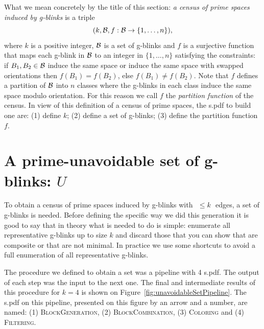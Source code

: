 \newpage

What we mean concretely by the title of this section:
{\it a census of prime spaces induced by
g-blinks} is a triple \vspace{-0.3cm}$$(k,{\cal B},f:{\cal B}
\rightarrow \{1, \ldots, n\}),\vspace{-0.3cm}$$ where $k$ is a
positive integer, ${\cal B}$ is a \kpu set of g-blinks and $f$ is a
surjective function that maps each g-blink in ${\cal B}$ to an integer
in $\{1, \ldots, n\}$ satisfying the constraints: if $B_1,B_2 \in
{\cal B}$ induce the same space or induce the same space with
swapped orientations then $f(B_1) = f(B_2)$, else
$f(B_1) \neq f(B_2)$. Note that $f$ defines a partition of ${\cal B}$
into $n$ classes where the g-blinks in each class induce the same space
modulo orientation. For this reason we call $f$ the
{\it partition function} of the census. In view of this definition of a
census of prime spaces, the s.pdf to build one are: (1) define $k$;
(2) define a \kpu set of g-blinks; (3) define the partition function $f$.

\newpage
\section{A prime-unavoidable set of g-blinks: $U$}

To obtain a census of prime spaces induced by g-blinks with $\,\,\leq
k \,\,$ edges, a set of \kpu g-blinks is needed. Before defining the
specific way we did this generation it is good to say that in theory
what is needed to do is simple: enumerate all representative g-blinks up to size
$k$ and discard those that you can show that are composite or that are
not minimal. In practice we use some shortcuts to avoid a full
enumeration of all representative g-blinks.

The procedure we defined to obtain a \kpu set was a pipeline with 4
s.pdf. The output of each step was the input to the next one. The
final and intermediate results of this procedure for $k=4$ is shown
on Figure~\ref{fig:unavoidableSetPipeline}. The s.pdf on this pipeline,
presented on this figure by an arrow and a number, are named:
(1) \textsc{BlockGeneration}, (2) \textsc{BlockCombination}, (3) \textsc{Coloring}
and (4) \textsc{Filtering}.

